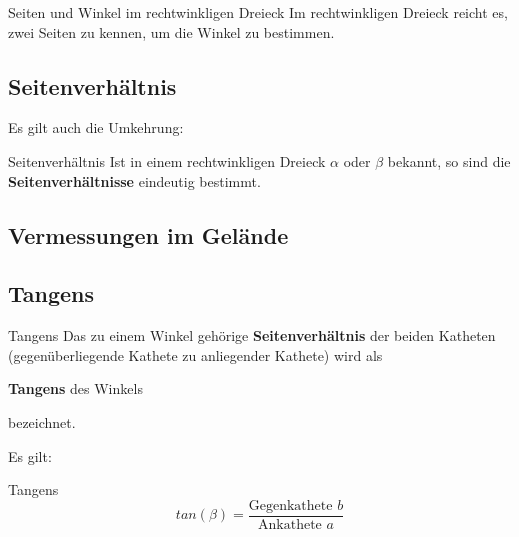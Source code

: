 \begin{gesetz}{Seiten und Winkel im rechtwinkligen Dreieck}{}
Im rechtwinkligen Dreieck reicht es, zwei Seiten zu kennen, um die
Winkel zu bestimmen.
\end{gesetz}


\subsection{Seitenverhältnis}
Es gilt auch die Umkehrung:
\begin{gesetz}{Seitenverhältnis}{}
Ist in einem rechtwinkligen Dreieck $\alpha$ oder $\beta$ bekannt, so
sind die \textbf{Seitenverhältnisse} eindeutig bestimmt.
\end{gesetz}
\newpage

\subsection{Vermessungen im Gelände}





\newpage
\subsection{Tangens}

\begin{definition}{Tangens}{}
Das zu einem Winkel gehörige \textbf{Seitenverhältnis} der beiden
Katheten (gegenüberliegende Kathete zu anliegender Kathete) wird als

\begin{center}\textbf{Tangens} des Winkels\end{center}
  bezeichnet.
\end{definition}
Es gilt:

\begin{gesetz}{Tangens}{}
  $$tan(\beta) = \frac{\text{Gegenkathete } b}{\text{Ankathete } a}$$
\end{gesetz}

